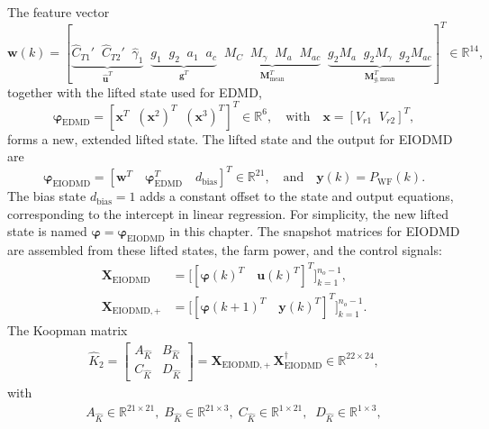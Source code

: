%
The feature vector
\begin{equation} \label{eq:wFeatWRC}
    \bm{w}(k) = [\underbrace{\hat{C}_{T1}' \;\; \hat{C}_{T2}' \;\; \hat{\gamma}_1}_{\hat{\bm{u}}^T} \;\; \underbrace{g_1 \;\; g_2\;\; a_1\;\; a_c}_{\bm{g}^T} \;\; \underbrace{M_{C} \;\; M_{\gamma} \;\; M_{a} \;\; M_{ac}}_{\bm{M}_{\text{mean}}^T} \;\; \underbrace{g_2 M_{a} \;\; g_2 M_{\gamma} \;\; g_2 M_{ac}}_{\bm{M}_{g,\text{mean}}^T}]^T \in \mathbb{R}^{14},
\end{equation}
together with the lifted state used for EDMD,
\begin{equation}
    \bm{\varphi}_{\text{EDMD}} = [\bm{x}^T \;\; (\bm{x}^2)^T \;\; (\bm{x}^3)^T]^T \in \mathbb{R}^{6}, \quad \text{with} \quad \bm{x} = [V_{r1} \;\; V_{r2}]^T,
\end{equation}
forms a new, extended lifted state. The lifted state and the output for EIODMD are
%
\begin{equation}
    \bm{\varphi}_{\text{EIODMD}}= [\bm{w}^T \quad  \bm{\varphi}_{\text{EDMD}}^T \quad d_{\text{bias}}]^T \in \mathbb{R}^{21}, \quad \text{and} \quad \bm{y}(k) = P_{\text{WF}}(k).
\end{equation}
%
The bias state $d_{\text{bias}} = 1$ adds a constant offset to the state and output equations, corresponding to the intercept in linear regression. For simplicity, the new lifted state is named $\bm{\varphi} = \bm{\varphi}_{\text{EIODMD}}$ in this chapter. The snapshot matrices for EIODMD are assembled from these lifted states, the farm power, and the control signals:
\begin{align}
    \bm{X}_{\text{EIODMD}} &= \bigl[ [\bm{\varphi}(k)^T \quad \bm{u}(k)^T]^T \bigr]_{k=1}^{n_o-1}, \\
    \bm{X}_{\text{EIODMD},+} &= \bigl[ [\bm{\varphi}(k+1)^T \quad \bm{y}(k)^T]^T \bigr]_{k=1}^{n_o-1}.
\end{align}
The Koopman matrix
\begin{align}\label{eq:Koop2}
    \hat{K}_{2} = \left[\begin{array}{c|c} A_{\hat{K}}  & B_{\hat{K}}\\ \hline C_{\hat{K}}  & D_{\hat{K}} \end{array}\right] = \bm{X}_{\text{EIODMD},+}\,\bm{X}_{\text{EIODMD}}^{\dagger} \in \mathbb{R}^{22\times24},
\end{align}
with
\begin{align*}
    A_{\hat{K}} \in \mathbb{R}^{21\times21},\; B_{\hat{K}}\in \mathbb{R}^{21\times3},\; C_{\hat{K}} \in \mathbb{R}^{1\times21},\;\; D_{\hat{K}}\in \mathbb{R}^{1\times3},
\end{align*}
